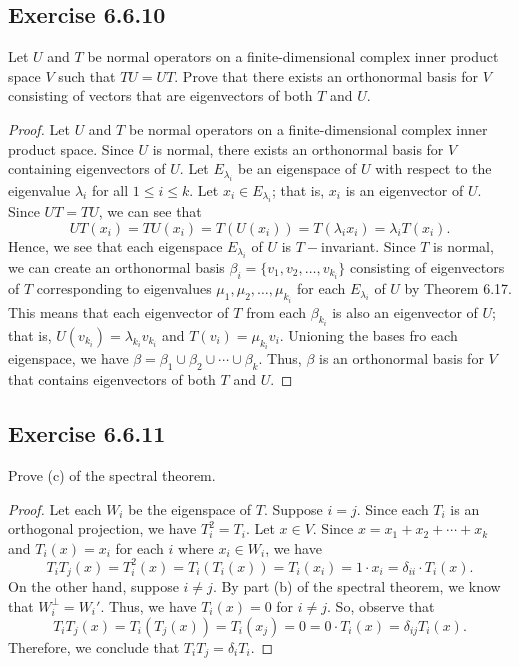 \subsection*{Exercise 6.6.10} Let \( U \) and \( T  \) be normal operators on a finite-dimensional complex inner product space \( V  \) such that \( TU = UT  \). Prove that there exists an orthonormal basis for \( V  \) consisting of vectors that are eigenvectors of both \( T  \) and \( U  \).
\begin{proof}
Let \( U  \) and \( T  \) be normal operators on a finite-dimensional complex inner product space. Since \( U  \) is normal, there exists an orthonormal basis for \( V  \) containing eigenvectors of \( U  \). Let \( {E}_{{\lambda}_{i}} \) be an eigenspace of \( U  \) with respect to the eigenvalue \( {\lambda}_{i} \) for all \( 1 \leq i \leq k  \). Let \( {x}_{i} \in {E}_{{\lambda}_{i}} \); that is, \( {x}_{i} \) is an eigenvector of \( U \). Since \( UT = TU  \), we can see that  
\[  UT({x}_{i}) = TU({x}_{i}) = T(U({x}_{i})) = T({\lambda}_{i} {x}_{i}) = {\lambda}_{i} T({x}_{i}). \]
Hence, we see that each eigenspace \( {E}_{{\lambda}_{i}} \) of \( U \) is \( T- \)invariant. Since \( T \) is normal, we can create an orthonormal basis \( \beta_i = \{ {v}_{1}, {v}_{2}, \dots, {v}_{{k }_{i}} \}  \) consisting of eigenvectors of \( T  \) corresponding to eigenvalues \( {\mu}_{1}, {\mu}_{2}, \dots, {\mu}_{{k}_{i}} \) for each \( {E}_{{\lambda}_{i}} \) of \( U \) by Theorem 6.17. This means that each eigenvector of \( T  \) from each \( {\beta}_{{k}_{i}} \) is also an eigenvector of \( U  \); that is, \( U({v}_{{k}_{i}}) = \lambda_{{k}_{i}} {v}_{{k}_{i}} \) and \( T({v}_{i}) = {\mu}_{{k}_{i}} {v}_{i} \). Unioning the bases fro each eigenspace, we have \( \beta = {\beta}_{1} \cup {\beta}_{2} \cup \cdots \cup {\beta}_{k}  \). Thus, \( \beta \) is an orthonormal basis for \( V  \) that contains eigenvectors of both \( T \) and \( U  \).  
\end{proof}

\subsection*{Exercise 6.6.11} Prove (c) of the spectral theorem.
\begin{proof}
    Let each \( {W}_{i}  \) be the eigenspace of \( T \). Suppose \( i = j  \). Since each \( {T}_{i}  \) is an orthogonal projection, we have \( T_{i}^{2} = {T}_{i}  \). Let \( x \in V  \). Since \( x = {x}_{1} + {x}_{2} + \cdots + {x}_{k } \) and \( {T}_{i}(x) = {x}_{i} \) for each \( i \) where \( {x}_{i} \in {W}_{i} \), we have
    \[ {T}_{i}{T}_{j}(x) = {T}_{i}^{2}(x) = {T}_{i}({T}_{i}(x)) = {T}_{i}({x}_{i}) = 1 \cdot {x}_{i} = {\delta}_{ii}  \cdot {T}_{i}(x).  \]
    On the other hand, suppose \( i \neq j  \). By part (b) of the spectral theorem, we know that \( {W}_{i}^{\perp} = {W}_{i}'  \). Thus, we have \( {T}_{i}(x) = 0   \) for \( i \neq j  \). So, observe that 
    \[  {T}_{i}{T}_{j}(x) = {T}_{i}({T}_{j}(x)) = {T}_{i}({x}_{j}) = 0 = 0 \cdot {T}_{i}(x) = {\delta}_{ij} {T}_{i}(x). \]
    Therefore, we conclude that \( {T}_{i}{T}_{j} = {\delta}_{i} {T}_{i}  \).
\end{proof}

